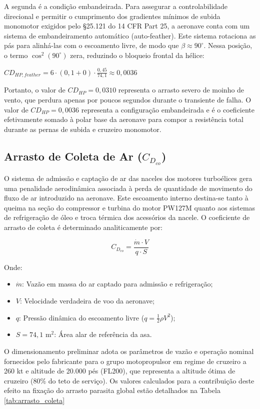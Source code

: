 A segunda é a condição embandeirada. Para assegurar a controlabilidade direcional e permitir o cumprimento dos gradientes mínimos de subida monomotor exigidos pelo \S 25.121 do 14 CFR Part 25, a aeronave conta com um sistema de embandeiramento automático (auto-feather). Este sistema rotaciona as pás para alinhá-las com o escoamento livre, de modo que $\beta \approx 90^\circ$. Nessa posição, o termo $\cos^2(90^\circ)$ zera, reduzindo o bloqueio frontal da hélice:

$CD_{HP, feather} = 6 \cdot (0,1 + 0) \cdot \frac{0,45}{74,1} \approx 0,0036$

Portanto, o valor de $CD_{HP} = 0,0310$ representa o arrasto severo de moinho de vento, que perdura apenas por poucos segundos durante o transiente de falha. O valor de $CD_{HP} = 0,0036$ representa a configuração embandeirada e é o coeficiente efetivamente somado à polar base da aeronave para compor a resistência total durante as pernas de subida e cruzeiro monomotor.

\subsection{Arrasto de Coleta de Ar ($C_{D_{co}}$)}

O sistema de admissão e captação de ar das naceles dos motores turboélices gera uma penalidade aerodinâmica associada à perda de quantidade de movimento do fluxo de ar introduzido na aeronave. Este escoamento interno destina-se tanto à queima na seção do compressor e turbina do motor PW127M quanto aos sistemas de refrigeração de óleo e troca térmica dos acessórios da nacele. O coeficiente de arrasto de coleta é determinado analiticamente por:

\begin{equation}
    C_{D_{co}} = \frac{\dot{m} \cdot V}{q \cdot S}
\end{equation}

Onde:
\begin{itemize}
    \item $\dot{m}$: Vazão em massa do ar captado para admissão e refrigeração;
    \item $V$: Velocidade verdadeira de voo da aeronave;
    \item $q$: Pressão dinâmica do escoamento livre ($q = \frac{1}{2} \rho V^2$);
    \item $S = 74,1 \text{ m}^2$: Área alar de referência da asa.
\end{itemize}

O dimensionamento preliminar adota os parâmetros de vazão e operação nominal fornecidos pelo fabricante para o grupo motopropulsor em regime de cruzeiro a 260 kt e altitude de 20.000 pés (FL200), que representa a altitude ótima de cruzeiro (80\% do teto de serviço). Os valores calculados para a contribuição deste efeito na fixação do arrasto parasita global estão detalhados na Tabela \ref{tab:arrasto_coleta}

